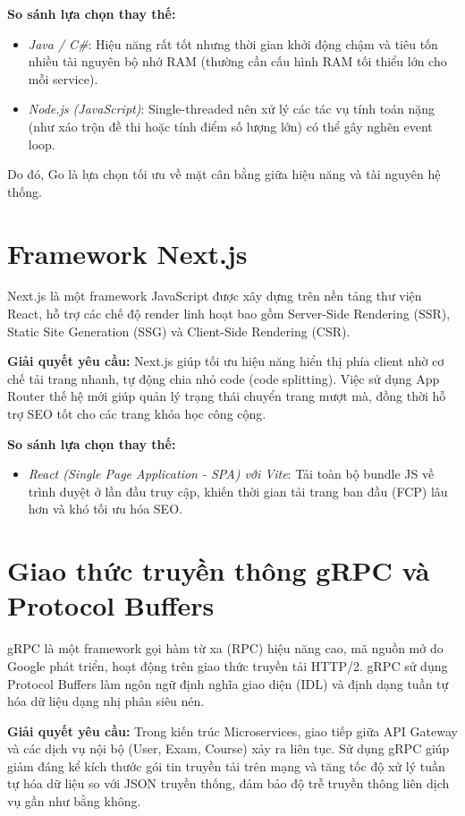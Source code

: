 \documentclass[../DoAn.tex]{subfiles}
\begin{document}
\textbf{So sánh lựa chọn thay thế:}
\begin{itemize}
    \item \textit{Java / C\#}: Hiệu năng rất tốt nhưng thời gian khởi động chậm và tiêu tốn nhiều tài nguyên bộ nhớ RAM (thường cần cấu hình RAM tối thiểu lớn cho mỗi service).
    \item \textit{Node.js (JavaScript)}: Single-threaded nên xử lý các tác vụ tính toán nặng (như xáo trộn đề thi hoặc tính điểm số lượng lớn) có thể gây nghẽn event loop.
\end{itemize}
Do đó, Go là lựa chọn tối ưu về mặt cân bằng giữa hiệu năng và tài nguyên hệ thống.

\section{Framework Next.js}
\label{section:3.3}
Next.js là một framework JavaScript được xây dựng trên nền tảng thư viện React, hỗ trợ các chế độ render linh hoạt bao gồm Server-Side Rendering (SSR), Static Site Generation (SSG) và Client-Side Rendering (CSR).

\textbf{Giải quyết yêu cầu:} Next.js giúp tối ưu hiệu năng hiển thị phía client nhờ cơ chế tải trang nhanh, tự động chia nhỏ code (code splitting). Việc sử dụng App Router thế hệ mới giúp quản lý trạng thái chuyển trang mượt mà, đồng thời hỗ trợ SEO tốt cho các trang khóa học công cộng.

\textbf{So sánh lựa chọn thay thế:}
\begin{itemize}
    \item \textit{React (Single Page Application - SPA) với Vite}: Tải toàn bộ bundle JS về trình duyệt ở lần đầu truy cập, khiến thời gian tải trang ban đầu (FCP) lâu hơn và khó tối ưu hóa SEO.
\end{itemize}

\section{Giao thức truyền thông gRPC và Protocol Buffers}
\label{section:3.4}
gRPC là một framework gọi hàm từ xa (RPC) hiệu năng cao, mã nguồn mở do Google phát triển, hoạt động trên giao thức truyền tải HTTP/2. gRPC sử dụng Protocol Buffers làm ngôn ngữ định nghĩa giao diện (IDL) và định dạng tuần tự hóa dữ liệu dạng nhị phân siêu nén.

\textbf{Giải quyết yêu cầu:} Trong kiến trúc Microservices, giao tiếp giữa API Gateway và các dịch vụ nội bộ (User, Exam, Course) xảy ra liên tục. Sử dụng gRPC giúp giảm đáng kể kích thước gói tin truyền tải trên mạng và tăng tốc độ xử lý tuần tự hóa dữ liệu so với JSON truyền thống, đảm bảo độ trễ truyền thông liên dịch vụ gần như bằng không.
\end{document}

